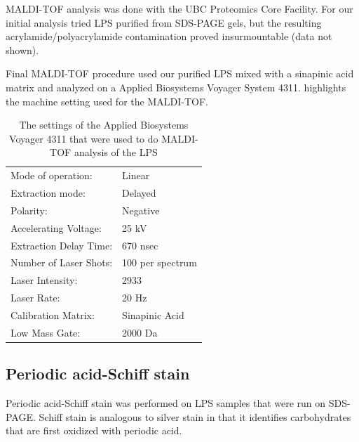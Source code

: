     \ac{MALDI-TOF} analysis was done with the UBC Proteomics Core Facility. For our initial analysis  tried \ac{LPS} purified from \ac{SDS-PAGE} gels, but the resulting acrylamide/polyacrylamide contamination proved insurmountable (data not shown). 

    Final \ac{MALDI-TOF} procedure used our purified \ac{LPS} mixed with a sinapinic acid matrix and analyzed on a Applied Biosystems Voyager System 4311.  highlights the machine setting used for the \ac{MALDI-TOF}.
     
    \begin{table}[htb]
      \centering
      \caption[\ac{MALDI-TOF} settings]{The settings of the Applied Biosystems Voyager 4311 that were used to do \ac{MALDI-TOF} analysis of the \caulobacter{} \ac{LPS}}
      \label{tab:mssettings}
      \begin{tabular}{ll}
        \toprule
        Mode of operation:     & Linear           \\
        Extraction mode:       & Delayed          \\
        Polarity:              & Negative         \\
        Accelerating Voltage:  & 25 kV            \\
        Extraction Delay Time: & 670 nsec         \\
        Number of Laser Shots: & 100 per spectrum \\
        Laser Intensity:       & 2933             \\
        Laser Rate:            & 20 Hz            \\
        Calibration Matrix:    & Sinapinic Acid    \\
        Low Mass Gate:         & 2000 Da      \\   \bottomrule
      \end{tabular}
    \end{table}

    \subsection{Periodic acid-Schiff stain} %
    \label{sub:schiff_stain}
		
    Periodic   acid-Schiff   stain   was   performed   on  \ac{LPS}   samples   that   were   run   on
    \ac{SDS-PAGE}. Schiff stain is analogous to silver  stain in that it identifies carbohydrates that
    are first oxidized with periodic acid.

